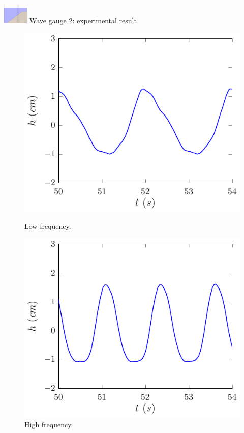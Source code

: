 \documentclass[pdf]{beamer}
\begin{document}
\begin{frame}{\includegraphics[width=1.2cm]{./Pics/WT2z.pdf} \hspace{1cm} Wave gauge 2: experimental result}
    \begin{figure}
    	\centering
    	\begin{minipage}{.5\textwidth}
    		\centering
    		\includegraphics[width=0.9\linewidth]{./Pics/SL/WG2/1e-figure0.pdf}
    		\caption{Low frequency.}
    	\end{minipage}%
    	\begin{minipage}{.5\textwidth}
    		\centering
    		\includegraphics[width=0.9\linewidth]{./Pics/SH/WG2/1e-figure0.pdf}
    		\caption{High frequency.}
    	\end{minipage}
    \end{figure}
\end{frame}
\end{document}
